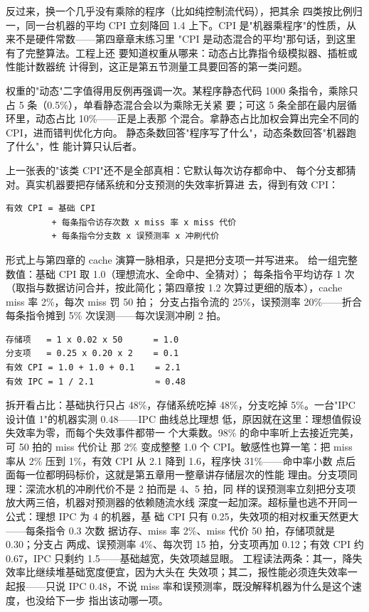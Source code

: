 反过来，换一个几乎没有乘除的程序（比如纯控制流代码），把其余
四类按比例归一，同一台机器的平均 CPI 立刻降回 1.4 上下。CPI
是"机器乘程序"的性质，从来不是硬件常数——第四章章末练习里
"CPI 是动态混合的平均"那句话，到这里有了完整算法。工程上还
要知道权重从哪来：动态占比靠指令级模拟器、插桩或性能计数器统
计得到，这正是第五节测量工具要回答的第一类问题。

权重的"动态"二字值得用反例再强调一次。某程序静态代码 1000
条指令，乘除只占 5 条（0.5\%），单看静态混合会以为乘除无关紧
要；可这 5 条全部在最内层循环里，动态占比 10\%——正是上表那
个混合。拿静态占比加权会算出完全不同的 CPI，进而错判优化方向。
静态条数回答"程序写了什么"，动态条数回答"机器跑了什么"，性
能计算只认后者。

上一张表的"该类 CPI"还不是全部真相：它默认每次访存都命中、
每个分支都猜对。真实机器要把存储系统和分支预测的失效率折算进
去，得到有效 CPI：

\begin{lstlisting}
有效 CPI = 基础 CPI
         + 每条指令访存次数 x miss 率 x miss 代价
         + 每条指令分支数 x 误预测率 x 冲刷代价
\end{lstlisting}

形式上与第四章的 cache 演算一脉相承，只是把分支项一并写进来。
给一组完整数值：基础 CPI 取 1.0（理想流水、全命中、全猜对）；
每条指令平均访存 1 次（取指与数据访问合并，按此简化；第四章按
1.2 次算过更细的版本），cache miss 率 2\%，每次 miss 罚 50 拍；
分支占指令流的 25\%，误预测率 20\%——折合每条指令摊到 5\%
次误测——每次误测冲刷 2 拍。

\begin{lstlisting}
存储项   = 1 x 0.02 x 50      = 1.0
分支项   = 0.25 x 0.20 x 2    = 0.1
有效 CPI = 1.0 + 1.0 + 0.1    = 2.1
有效 IPC = 1 / 2.1            ≈ 0.48
\end{lstlisting}

拆开看占比：基础执行只占 48\%，存储系统吃掉 48\%，分支吃掉
5\%。一台"IPC 设计值 1"的机器实测 0.48——IPC 曲线总比理想
低，原因就在这里：理想值假设失效率为零，而每个失效事件都带一
个大乘数。98\% 的命中率听上去接近完美，可 50 拍的 miss 代价让
那 2\% 变成整整 1.0 个 CPI。敏感性也算一笔：把 miss 率从 2\%
压到 1\%，有效 CPI 从 2.1 降到 1.6，程序快 31\%——命中率小数
点后面每一位都明码标价，这就是第五章用一整章讲存储层次的性能
理由。分支项同理：深流水机的冲刷代价不是 2 拍而是 4、5 拍，同
样的误预测率立刻把分支项放大两三倍，机器对预测器的依赖随流水线
深度一起加深。超标量也逃不开同一公式：理想 IPC 为 4 的机器，基
础 CPI 只有 0.25，失效项的相对权重天然更大——每条指令 0.3 次数
据访存、miss 率 2\%、miss 代价 50 拍，存储项就是 0.30；分支占
两成、误预测率 4\%、每次罚 15 拍，分支项再加 0.12；有效 CPI 约
0.67，IPC 只剩约 1.5——基础越宽，失效项越显眼。
工程读法两条：其一，降失效率比继续堆基础宽度便宜，因为大头在
失效项；其二，报性能必须连失效率一起报——只说 IPC 0.48，不说
miss 率和误预测率，既没解释机器为什么是这个速度，也没给下一步
指出该动哪一项。

